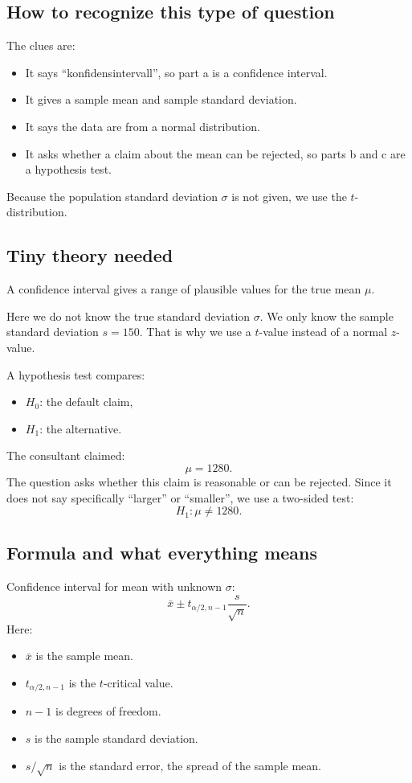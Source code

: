 \documentclass[11pt,a4paper]{article}
\begin{document}
\subsection*{How to recognize this type of question}
The clues are:
\begin{itemize}[leftmargin=*]
    \item It says ``konfidensintervall'', so part a is a confidence interval.
    \item It gives a sample mean and sample standard deviation.
    \item It says the data are from a normal distribution.
    \item It asks whether a claim about the mean can be rejected, so parts b and c are a hypothesis test.
\end{itemize}

Because the population standard deviation \(\sigma\) is not given, we use the \(t\)-distribution.

\subsection*{Tiny theory needed}
A confidence interval gives a range of plausible values for the true mean \(\mu\).

Here we do not know the true standard deviation \(\sigma\). We only know the sample standard deviation \(s=150\). That is why we use a \(t\)-value instead of a normal \(z\)-value.

A hypothesis test compares:
\begin{itemize}[leftmargin=*]
    \item \(H_0\): the default claim,
    \item \(H_1\): the alternative.
\end{itemize}

The consultant claimed:
\[
\mu=1280.
\]
The question asks whether this claim is reasonable or can be rejected. Since it does not say specifically ``larger'' or ``smaller'', we use a two-sided test:
\[
H_1:\mu\ne 1280.
\]

\subsection*{Formula and what everything means}
Confidence interval for mean with unknown \(\sigma\):
\[
\bar{x}\pm t_{\alpha/2,n-1}\frac{s}{\sqrt{n}}.
\]
Here:
\begin{itemize}[leftmargin=*]
    \item \(\bar{x}\) is the sample mean.
    \item \(t_{\alpha/2,n-1}\) is the \(t\)-critical value.
    \item \(n-1\) is degrees of freedom.
    \item \(s\) is the sample standard deviation.
    \item \(s/\sqrt{n}\) is the standard error, the spread of the sample mean.
\end{itemize}
\end{document}
